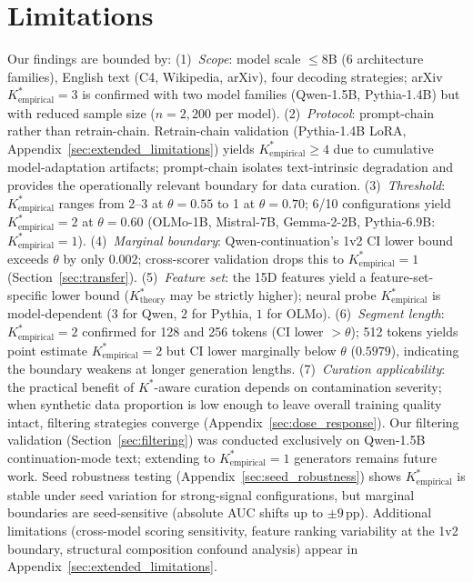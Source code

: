 \documentclass[11pt]{article}
\newcommand{\Kstar}{{K^*}}
\newcommand{\Kempirical}{{K^*_{\text{empirical}}}}
\newcommand{\Ktheory}{{K^*_{\text{theory}}}}
\begin{document}
\section*{Limitations}

Our findings are bounded by:
(1)~\emph{Scope}: model scale $\leq$8B (6 architecture families), English text (C4, Wikipedia, arXiv), four decoding strategies; arXiv $\Kempirical{=}3$ is confirmed with two model families (Qwen-1.5B, Pythia-1.4B) but with reduced sample size ($n{=}2{,}200$ per model).
(2)~\emph{Protocol}: prompt-chain rather than retrain-chain. Retrain-chain validation (Pythia-1.4B LoRA, Appendix~\ref{sec:extended_limitations}) yields $\Kempirical{\geq}4$ due to cumulative model-adaptation artifacts; prompt-chain isolates text-intrinsic degradation and provides the operationally relevant boundary for data curation.
(3)~\emph{Threshold}: $\Kempirical$ ranges from 2--3 at $\theta{=}0.55$ to 1 at $\theta{=}0.70$; 6/10 configurations yield $\Kempirical{=}2$ at $\theta{=}0.60$ (OLMo-1B, Mistral-7B, Gemma-2-2B, Pythia-6.9B: $\Kempirical{=}1$).
(4)~\emph{Marginal boundary}: Qwen-continuation's 1v2 CI lower bound exceeds $\theta$ by only 0.002; cross-scorer validation drops this to $\Kempirical{=}1$ (Section~\ref{sec:transfer}).
(5)~\emph{Feature set}: the 15D features yield a feature-set-specific lower bound ($\Ktheory$ may be strictly higher); neural probe $\Kempirical$ is model-dependent ($3$ for Qwen, $2$ for Pythia, $1$ for OLMo).
(6)~\emph{Segment length}: $\Kempirical{=}2$ confirmed for 128 and 256 tokens (CI lower $> \theta$); 512 tokens yields point estimate $\Kempirical{=}2$ but CI lower marginally below $\theta$ ($0.5979$), indicating the boundary weakens at longer generation lengths.
(7)~\emph{Curation applicability}: the practical benefit of $\Kstar$-aware curation depends on contamination severity; when synthetic data proportion is low enough to leave overall training quality intact, filtering strategies converge (Appendix~\ref{sec:dose_response}).
Our filtering validation (Section~\ref{sec:filtering}) was conducted exclusively on Qwen-1.5B continuation-mode text; extending to $\Kempirical{=}1$ generators remains future work.
Seed robustness testing (Appendix~\ref{sec:seed_robustness}) shows $\Kempirical$ is stable under seed variation for strong-signal configurations, but marginal boundaries are seed-sensitive (absolute AUC shifts up to ${\pm}9$\,pp).
Additional limitations (cross-model scoring sensitivity, feature ranking variability at the 1v2 boundary, structural composition confound analysis) appear in Appendix~\ref{sec:extended_limitations}.
\end{document}

